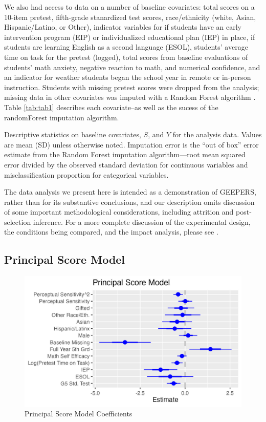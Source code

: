 \documentclass[11pt]{article} %
\begin{document}
We also had access to data on a number of baseline covariates: total scores on a 10-item pretest, fifth-grade stanardized test scores, race/ethnicity (white, Asian, Hispanic/Latino, or Other), indicator variables for if students have an early intervention program (EIP) or individualized educational plan (IEP) in place, if students are learning English as a second language (ESOL), students' average time on task for the pretest (logged), total scores from baseline evaluations of students' math anxiety, negative reaction to math, and numerical confidence, and an indicator for weather students began the school year in remote or in-person instruction.
Students with missing pretest scores were dropped from the analysis; missing data in other covariates was imputed with a Random Forest algorithm \citep{missForest}.
Table \ref{tab:tab1} describes each covariate--as well as the sucess of the randomForest imputation algorithm.

\begin{table}
  \centering
  
  \caption{Descriptive statistics on baseline covariates, $S$, and $Y$ for the analysis data. Values are mean (SD) unless otherwise noted. Imputation error is the ``out of box'' error estimate from the Random Forest imputation algorithm---root mean squared error divided by the observed standard deviation for continuous variables and misclassification proportion for categorical variables.}
  \label{tab:tab1}
\end{table}

The data analysis we present here is intended as a demonstration of GEEPERS, rather than for its substantive conclusions, and our description omits discussion of some important methodological considerations, including attrition and post-selection inference. For a more complete discussion of the experimental design, the conditions being compared, and the impact analysis, please see \citet{impactPaper}.

\subsection{Principal Score Model}

\begin{figure}
  \centering
  \includegraphics{../figure/psModCoef.jpg}
  \caption{Principal Score Model Coefficients}
  \label{fig:psMod}
\end{figure}
\end{document}
